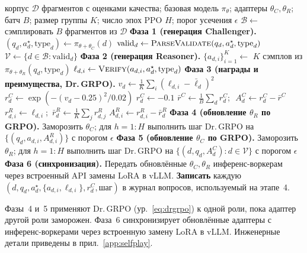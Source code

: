 \documentclass{article}
\begin{document}
\begin{algorithm}[t]
\caption{Самоигра на основе корпуса (один внешний шаг).}
\label{alg:selfplay}
\begin{algorithmic}[1]
\Require корпус $\mathcal{D}$ фрагментов с оценками качества; базовая модель $\pi_\theta$; адаптеры $\theta_C, \theta_R$; батч $B$; размер группы $K$; число эпох PPO $H$; порог усечения $\epsilon$
\State $\mathcal{B} \gets$ сэмплировать $B$ фрагментов из $\mathcal{D}$
\Statex \textbf{Фаза 1 (генерация Challenger).}
  \State $(q_d, a^\star_d, \text{type}_d) \gets \pi_{\theta + \theta_C}(d)$
  \State $\text{valid}_d \gets \text{\textsc{ParseValidate}}(q_d, a^\star_d, \text{type}_d)$
\EndFor
\State $\mathcal{V} \gets \{ d \in \mathcal{B} : \text{valid}_d \}$
\Statex \textbf{Фаза 2 (генерация Reasoner).}
  \State $\{a_{d,i}\}_{i=1}^{K} \gets$ $K$ сэмплов из $\pi_{\theta + \theta_R}(q_d, \text{type}_d)$
  \State $\ell_{d,i} \gets \text{\textsc{Verify}}(a_{d,i}, a^\star_d, \text{type}_d)$
\EndFor
\Statex \textbf{Фаза 3 (награды и преимущества, Dr.\,GRPO).}
    \State $v_d \gets \tfrac{1}{K}\!\sum_i\!(\ell_{d,i} - \bar\ell_d)^2$
    \State $r^C_d \gets \exp(-(v_d - 0.25)^2 / 0.02)$
  \Else
    \State $r^C_d \gets -0.1$ 
  \EndIf
\EndFor
\State $\bar r^C \gets \tfrac{1}{B}\sum_d r^C_d$;\,\, $A^C_d \gets r^C_d - \bar r^C$
  \State $r^R_{d,i} \gets \ell_{d,i}$;\,
        $\bar r^R_d \gets \tfrac{1}{K}\sum_j r^R_{d,j}$
  \State $A^R_{d,i} \gets r^R_{d,i} - \bar r^R_d$
\EndFor
\Statex \textbf{Фаза 4 (обновление $\theta_R$ по GRPO).}
\State Заморозить $\theta_C$; для $h = 1\!:\!H$ выполнить шаг Dr.\,GRPO на
\Statex \quad $\{(q_d, a_{d,i}, A^R_{d,i})\}$ с порогом $\epsilon$
\Statex \textbf{Фаза 5 (обновление $\theta_C$ по GRPO).}
\State Заморозить $\theta_R$; для $h = 1\!:\!H$ выполнить шаг Dr.\,GRPO на
\Statex \quad $\{(d, q_d, A^C_d) : d \in \mathcal{V}\}$ с порогом $\epsilon$
\Statex \textbf{Фаза 6 (синхронизация).}
\State Передать обновлённые $\theta_C, \theta_R$ инференс-воркерам
\Statex \quad через встроенный API замены LoRA в vLLM.
\State \textbf{Записать} каждую $(d, q_d, a^\star_d, \{a_{d,i}, \ell_{d,i}\}, r^C_d, \text{шаг})$
\Statex \quad в журнал вопросов, используемый на этапе~4.
\end{algorithmic}
\end{algorithm}

Фазы~4 и~5 применяют Dr.\,GRPO (ур.~\eqref{eq:drgrpo}) к одной роли, пока адаптер другой роли заморожен. Фаза~6 синхронизирует обновлённые адаптеры с инференс-воркерами через встроенную замену LoRA в vLLM. Инженерные детали приведены в прил.~\ref{app:selfplay}.
\end{document}
